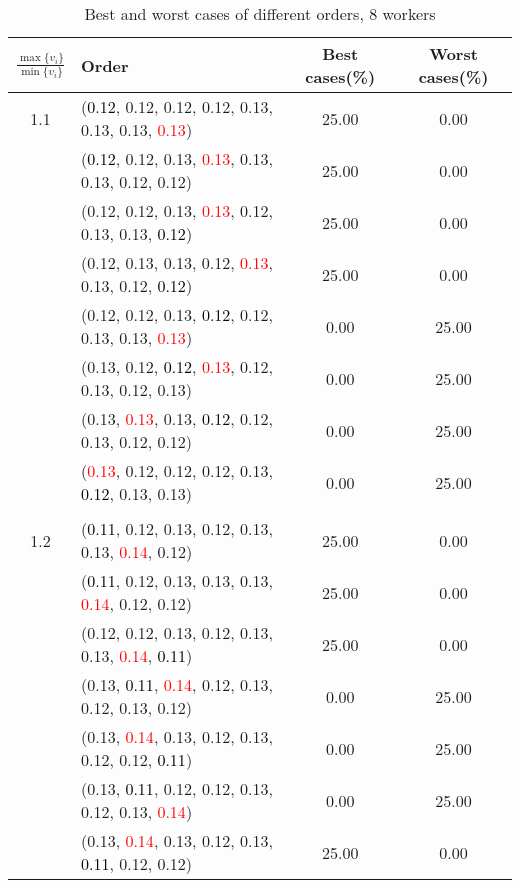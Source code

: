 \documentclass[10pt,a4paper]{report}
\begin{document}
\newpage\begin{center}
	\small
	\begin{longtable}{clcc}
		\caption{Best and worst cases of different orders, 8 workers}\\
		\toprule
		\setlength{\tabcolsep}{1mm}
		\renewcommand\baselinestretch{0.5}\selectfont
		$\frac{\max\{v_i\}}{\min\{v_i\}}$ & Order & Best cases(\%) & Worst cases(\%) \\
			\midrule		1.1			&(\textcolor{black}{0.12}, 0.12, 0.12, 0.12, 0.13, 0.13, 0.13, \textcolor{red}{0.13})&25.00&0.00\\
			&(\textcolor{black}{0.12}, 0.12, 0.13, \textcolor{red}{0.13}, 0.13, 0.13, 0.12, 0.12)&25.00&0.00\\
			&(0.12, 0.12, 0.13, \textcolor{red}{0.13}, 0.12, 0.13, 0.13, \textcolor{black}{0.12})&25.00&0.00\\
			&(0.12, 0.13, 0.13, 0.12, \textcolor{red}{0.13}, 0.13, 0.12, \textcolor{black}{0.12})&25.00&0.00\\
			&(0.12, 0.12, 0.13, \textcolor{black}{0.12}, 0.12, 0.13, 0.13, \textcolor{red}{0.13})&0.00&25.00\\
			&(0.13, 0.12, \textcolor{black}{0.12}, \textcolor{red}{0.13}, 0.12, 0.13, 0.12, 0.13)&0.00&25.00\\
			&(0.13, \textcolor{red}{0.13}, 0.13, \textcolor{black}{0.12}, 0.12, 0.13, 0.12, 0.12)&0.00&25.00\\
			&(\textcolor{red}{0.13}, 0.12, 0.12, 0.12, 0.13, \textcolor{black}{0.12}, 0.13, 0.13)&0.00&25.00\\
		&&&\\
		1.2			&(\textcolor{black}{0.11}, 0.12, 0.13, 0.12, 0.13, 0.13, \textcolor{red}{0.14}, 0.12)&25.00&0.00\\
			&(\textcolor{black}{0.11}, 0.12, 0.13, 0.13, 0.13, \textcolor{red}{0.14}, 0.12, 0.12)&25.00&0.00\\
			&(0.12, 0.12, 0.13, 0.12, 0.13, 0.13, \textcolor{red}{0.14}, \textcolor{black}{0.11})&25.00&0.00\\
			&(0.13, \textcolor{black}{0.11}, \textcolor{red}{0.14}, 0.12, 0.13, 0.12, 0.13, 0.12)&0.00&25.00\\
			&(0.13, \textcolor{red}{0.14}, 0.13, 0.12, 0.13, 0.12, 0.12, \textcolor{black}{0.11})&0.00&25.00\\
			&(0.13, \textcolor{black}{0.11}, 0.12, 0.12, 0.13, 0.12, 0.13, \textcolor{red}{0.14})&0.00&25.00\\
			&(0.13, \textcolor{red}{0.14}, 0.13, 0.12, 0.13, \textcolor{black}{0.11}, 0.12, 0.12)&25.00&0.00\\

\end{longtable}
\end{center}
\end{document}
